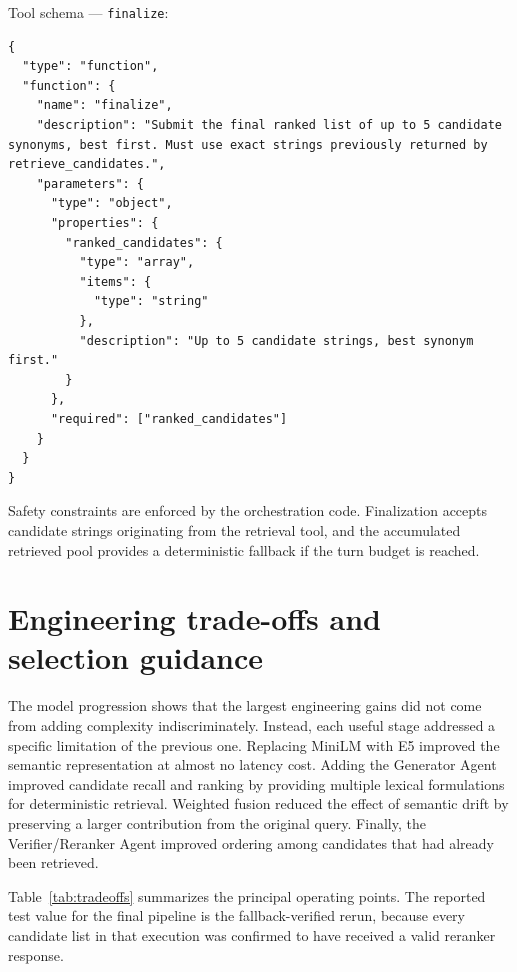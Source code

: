 Tool schema --- \texttt{finalize}:

\begin{lstlisting}[style=jsonstyle]
{
  "type": "function",
  "function": {
    "name": "finalize",
    "description": "Submit the final ranked list of up to 5 candidate synonyms, best first. Must use exact strings previously returned by retrieve_candidates.",
    "parameters": {
      "type": "object",
      "properties": {
        "ranked_candidates": {
          "type": "array",
          "items": {
            "type": "string"
          },
          "description": "Up to 5 candidate strings, best synonym first."
        }
      },
      "required": ["ranked_candidates"]
    }
  }
}
\end{lstlisting}

Safety constraints are enforced by the orchestration code. Finalization accepts candidate strings originating from the retrieval tool, and the accumulated retrieved pool provides a deterministic fallback if the turn budget is reached.

\section{Engineering trade-offs and selection guidance}

The model progression shows that the largest engineering gains did not come from adding complexity indiscriminately. Instead, each useful stage addressed a specific limitation of the previous one. Replacing MiniLM with E5 improved the semantic representation at almost no latency cost. Adding the Generator Agent improved candidate recall and ranking by providing multiple lexical formulations for deterministic retrieval. Weighted fusion reduced the effect of semantic drift by preserving a larger contribution from the original query. Finally, the Verifier/Reranker Agent improved ordering among candidates that had already been retrieved.

Table~\ref{tab:tradeoffs} summarizes the principal operating points. The reported test value for the final pipeline is the fallback-verified rerun, because every candidate list in that execution was confirmed to have received a valid reranker response.

